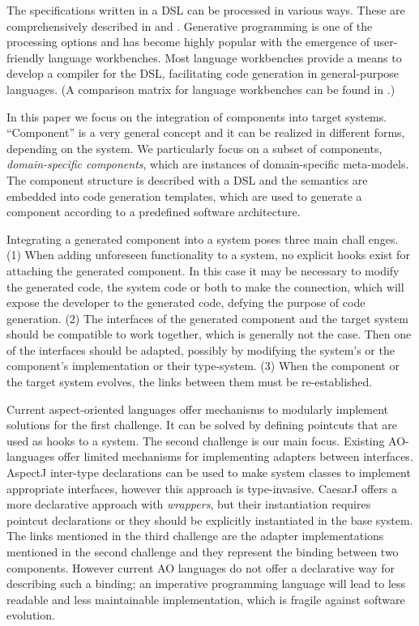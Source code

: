 \documentclass{acm_proc_article-sp}
\begin{document}
The specifications written in a DSL can be processed in various ways. These are
comprehensively described in \cite{Mernik:whenandhow} and
\cite{fowler2010domain}. Generative programming \cite{Czarnecki:overview} is one
of the processing options and has become highly popular with the emergence of
user-friendly language workbenches. Most language workbenches provide a means
to develop a compiler for the DSL, facilitating code generation in general-purpose
languages. (A comparison matrix for language workbenches can be found in
\cite{LWC}.) 

In this paper we focus on the integration of components into target systems.
``Component'' is a very general concept and it can be realized in different forms,
depending on the system. We particularly focus on a subset of components,
\emph{domain-specific components}, which are instances of domain-specific meta-models.
The component structure is described with a DSL and the semantics are embedded
into code generation templates, which are used to generate a component according to a predefined software architecture.
  

Integrating a generated component into a system poses three main chall enges.
(1) When adding unforeseen functionality to a
system, no explicit hooks exist for attaching the
generated component. In this case it may be necessary to modify the
generated code, the system code or both to make the connection, which will
expose the developer to the generated code, defying the purpose of code
generation. 
(2) The interfaces of the generated component and the target system should be compatible to work together, which is generally not the case. Then one of the interfaces should be adapted, possibly by modifying the system's or the component's implementation or their type-system.
(3) When the component or the target system evolves, the links between them
must be re-established. 



Current aspect-oriented languages offer mechanisms to modularly implement solutions for the first challenge. It can be solved by defining pointcuts that are used as hooks to a system. The second challenge is our main focus. Existing AO-languages offer limited mechanisms for implementing adapters between interfaces. AspectJ inter-type declarations can be used to make system classes to implement appropriate interfaces, however this approach is type-invasive. CaesarJ offers a more declarative approach with \emph{wrappers}, but their instantiation requires pointcut declarations or they should be explicitly instantiated in the base system. The links mentioned in the third challenge  are the adapter implementations mentioned in the second challenge and they represent the binding between two components. However current AO languages do not offer a declarative way for describing such a binding; an imperative programming language will lead to less readable and less maintainable implementation, which is fragile against software evolution.
\end{document}
